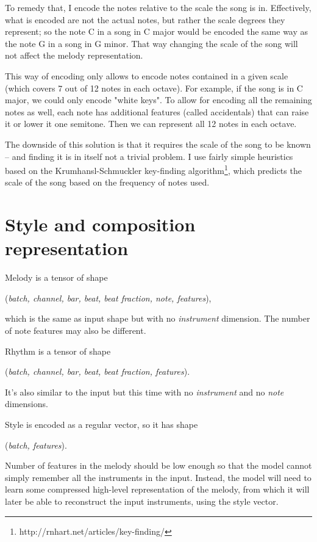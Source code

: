 \documentclass[en]{pracamgr}
\begin{document}
To remedy that, I encode the notes relative to the scale the song is in.
Effectively, what is encoded are not the actual notes, but rather the scale degrees they represent; so the note C in a song in C major would be encoded the same way as the note G in a song in G minor.
That way changing the scale of the song will not affect the melody representation.

This way of encoding only allows to encode notes contained in a given scale (which covers 7 out of 12 notes in each octave).
For example, if the song is in C major, we could only encode "white keys".
To allow for encoding all the remaining notes as well, each note has additional features (called accidentals) that can raise it or lower it one semitone.
Then we can represent all 12 notes in each octave.

The downside of this solution is that it requires the scale of the song to be known -- and finding it is in itself not a trivial problem.
I use fairly simple heuristics based on the Krumhansl-Schmuckler key-finding algorithm\footnote{http://rnhart.net/articles/key-finding/}, which predicts the scale of the song based on the frequency of notes used.

\section{Style and composition representation}

Melody is a tensor of shape
\begin{center}
    (\emph{batch, channel, bar, beat, beat fraction, note, features}),
\end{center}
which is the same as input shape but with no \emph{instrument} dimension.
The number of note features may also be different.

Rhythm is a tensor of shape
\begin{center}
    (\emph{batch, channel, bar, beat, beat fraction, features}).
\end{center}
It's also similar to the input but this time with no \emph{instrument} and no \emph{note} dimensions.

Style is encoded as a regular vector, so it has shape
\begin{center}
    (\emph{batch, features}).
\end{center}

Number of features in the melody should be low enough so that the model cannot simply remember all the instruments in the input.
Instead, the model will need to learn some compressed high-level representation of the melody, from which it will later be able to reconstruct the input instruments, using the style vector.
\end{document}
